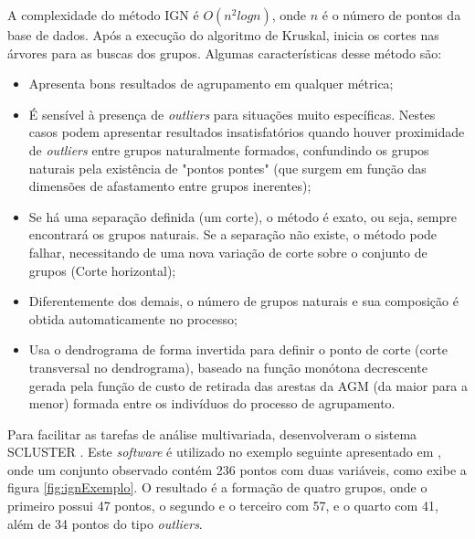 A complexidade do método \acrshort{IGN} é ${O(n^2 log n)}$, onde ${n}$ é o número de pontos da base de dados. Após a execução do algoritmo de Kruskal, inicia os cortes nas árvores para as buscas dos grupos.
Algumas características desse método são:
\begin{itemize}
\item Apresenta bons resultados de agrupamento em qualquer métrica;
\item É sensível à presença de \emph{outliers} para situações muito específicas. Nestes casos podem apresentar resultados insatisfatórios quando houver proximidade de \emph{outliers} entre grupos naturalmente formados, confundindo os grupos naturais pela existência de "pontos pontes" (que surgem em função das dimensões de afastamento entre grupos inerentes);
\item Se há uma separação definida (um corte), o método é exato, ou seja, sempre encontrará os grupos naturais. Se a separação não existe, o método pode falhar, necessitando de uma nova variação de corte sobre o conjunto de grupos (Corte horizontal);
\item Diferentemente dos demais, o número de grupos naturais e sua composição é obtida automaticamente no processo;
\item Usa o dendrograma de forma invertida para definir o ponto de corte (corte transversal no dendrograma), baseado na função monótona decrescente gerada pela função de custo de retirada das arestas da \acrshort{AGM} (da maior para a menor) formada entre os indivíduos do processo de agrupamento.
\end{itemize}

Para facilitar as tarefas de análise multivariada, \cite{ign} desenvolveram o sistema SCLUSTER \cite{scluster}. Este \textit{software} é utilizado no exemplo seguinte apresentado em , onde um conjunto observado contém 236 pontos com duas variáveis, como exibe a figura \ref{fig:ignExemplo}. O resultado é a formação de quatro grupos, onde o primeiro possui 47 pontos, o segundo e o terceiro com 57, e o quarto com 41, além de 34 pontos do tipo \textit{outliers}.

